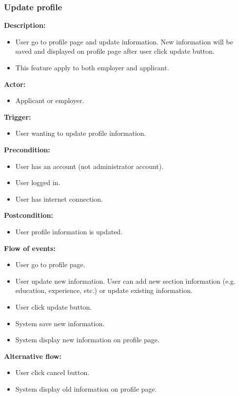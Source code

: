 \documentclass[a4paper]{article}
\begin{document}
\subsubsection{Update profile}
\textbf{Description:}
\begin{itemize}
  \item User go to profile page and update information. New information will be saved and displayed on profile page after user click update button.
  \item This feature apply to both employer and applicant.
\end{itemize}

\textbf{Actor:}
\begin{itemize}
  \item Applicant or employer.
\end{itemize}

\textbf{Trigger:}
\begin{itemize}
  \item User wanting to update profile information.
\end{itemize}

\textbf{Precondition:}
\begin{itemize}
  \item User has an account (not administrator account).
  \item User logged in.
  \item User has internet connection.
\end{itemize}

\textbf{Postcondition:}
\begin{itemize}
  \item User profile information is updated.
\end{itemize}

\textbf{Flow of events:}
\begin{itemize}
  \item User go to profile page.
  \item User update new information. User can add new section information (e.g. education, experience, etc.) or update existing information.
  \item User click update button.
  \item System save new information.
  \item System display new information on profile page.
\end{itemize}

\textbf{Alternative flow:}
\begin{itemize}
  \item User click cancel button.
  \item System display old information on profile page.
\end{itemize}
\end{document}
